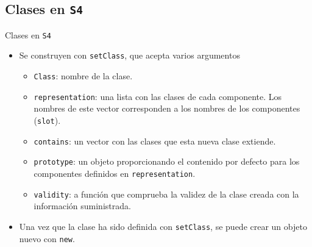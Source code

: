 \documentclass[xcolor={usenames,svgnames,dvipsnames}]{beamer}
\begin{document}
\subsection{Clases en \texttt{S4}}
\label{sec-3-1}
\begin{frame}[fragile,label=sec-3-1-1]{Clases en \texttt{S4}}
 \begin{itemize}
\item Se construyen con \texttt{setClass}, que acepta varios argumentos
\begin{itemize}
\item \texttt{Class}: nombre de la clase.
\item \texttt{representation}: una lista con las clases de cada componente. Los nombres de este vector corresponden a los nombres de los componentes (\texttt{slot}).
\item \texttt{contains}: un vector con las clases que esta nueva clase extiende.
\item \texttt{prototype}: un objeto proporcionando el contenido por defecto para los componentes definidos en \texttt{representation}.
\item \texttt{validity}: a función que comprueba la validez de la clase creada con la información suministrada.
\end{itemize}
\item Una vez que la clase ha sido definida con \texttt{setClass}, se puede crear
un objeto nuevo con \texttt{new}.
\end{itemize}
\end{frame}
\end{document}

